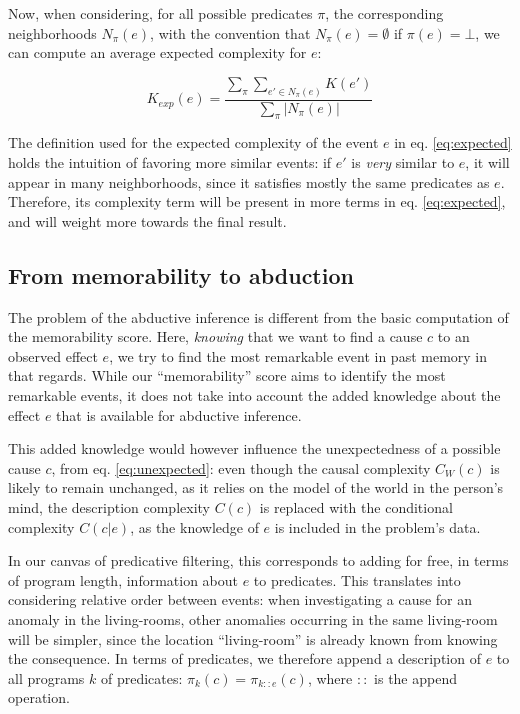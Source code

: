\documentclass[conference]{IEEEtran}
\begin{document}
Now, when considering, for all possible predicates $\pi$, the corresponding
neighborhoods $N_{\pi}(e)$, with the convention that $N_{\pi}(e) = \emptyset$
if $\pi(e) = \bot$, we can compute an average expected complexity for $e$:

\begin{equation}
\label{eq:expected}
K_{exp}(e) = \frac{
                    \sum_{\pi} \sum_{e' \in N_{\pi}(e)} K(e')
                  }{
                    \sum_{\pi} |N_{\pi}(e)|
                  }
\end{equation}

The definition used for the expected complexity of the event $e$ in eq.
\ref{eq:expected} holds the intuition of favoring more similar events: if $e'$
is \emph{very} similar to $e$, it will appear in many neighborhoods, since it
satisfies mostly the same predicates as $e$. Therefore, its complexity term will
be present in more terms in eq. \ref{eq:expected}, and will weight more towards
the final result.


\subsection{From memorability to abduction}
The problem of the abductive inference is different from the basic computation
of the memorability score. Here, \emph{knowing} that we want to find a cause $c$
to an observed effect $e$, we try to find the most remarkable event in past
memory in that regards. While our ``memorability'' score aims to identify the
most remarkable events, it does not take into account the added knowledge about
the effect $e$ that is available for abductive inference.

This added knowledge would however influence the unexpectedness of a possible
cause $c$, from eq. \ref{eq:unexpected}: even though the causal complexity
$C_{W}(c)$ is likely to remain unchanged, as it relies on the model of the world in
the person's mind, the description complexity $C(c)$ is replaced with the
conditional complexity $C(c|e)$, as the knowledge of $e$ is included in the
problem's data.

In our canvas of predicative filtering, this corresponds to adding for free, in
terms of program length, information about $e$ to predicates. This translates
into considering relative order between events: when investigating a cause for
an anomaly in the living-rooms, other anomalies occurring in the same
living-room will be simpler, since the location ``living-room'' is already known
from knowing the consequence. In terms of predicates, we therefore append a
description of $e$ to all programs $k$ of predicates:
$\pi_{k}(c) = \pi_{k::e}(c)$, where $::$ is the append operation.
\end{document}
